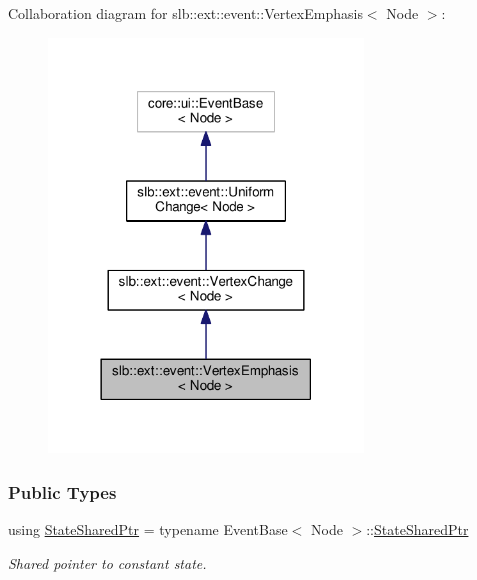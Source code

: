 Collaboration diagram for slb\+:\+:ext\+:\+:event\+:\+:Vertex\+Emphasis$<$ Node $>$\+:\nopagebreak
\begin{figure}[H]
\begin{center}
\leavevmode
\includegraphics[width=237pt]{structslb_1_1ext_1_1event_1_1VertexEmphasis__coll__graph}
\end{center}
\end{figure}
\subsubsection*{Public Types}
\begin{DoxyCompactItemize}
\item 
using \hyperlink{structslb_1_1ext_1_1event_1_1VertexEmphasis_a052915534ed9942fd8c5c2d24559fe6c}{State\+Shared\+Ptr} = typename Event\+Base$<$ Node $>$\+::\hyperlink{structslb_1_1ext_1_1event_1_1UniformChange_a2e6e9605dcd4df428c03c7637fd0d20d}{State\+Shared\+Ptr}\hypertarget{structslb_1_1ext_1_1event_1_1VertexEmphasis_a052915534ed9942fd8c5c2d24559fe6c}{}\label{structslb_1_1ext_1_1event_1_1VertexEmphasis_a052915534ed9942fd8c5c2d24559fe6c}

\begin{DoxyCompactList}\small\item\em Shared pointer to constant state. \end{DoxyCompactList}\end{DoxyCompactItemize}
